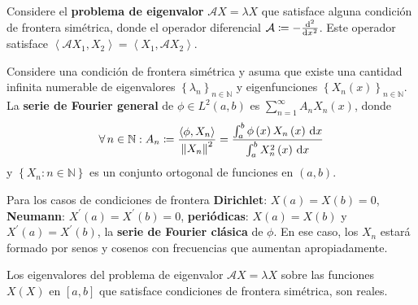 \noindent
Considere el \textbf{problema de eigenvalor}
$\mathcal{A}X=\lambda X$ que satisface alguna condición de frontera
simétrica, donde el operador diferencial
$\mathcal{A}\coloneqq -\diff[2]{}{x}$.
Este operador satisface
\begin{math}
    \left\langle\mathcal{A}X_{1},X_{2}\right\rangle=
    \left\langle X_{1},\mathcal{A}X_{2}\right\rangle
\end{math}.

\begin{definition}
    Considere una condición de frontera simétrica y asuma que existe
    una cantidad infinita numerable de eigenvalores
    ${\left\{\lambda_{n}\right\}}_{n\in\mathbb{N}}$ y eigenfunciones
    ${\left\{X_{n}\left(x\right)\right\}}_{n\in\mathbb{N}}$.
    La \textbf{serie de Fourier general} de
    $\phi\in L^{2}\left(a,b\right)$ es
    \begin{math}
        \sum\limits_{n=1}^{\infty}
        A_{n}X_{n}\left(x\right)
    \end{math},
    donde
    \vspace*{-\baselineskip}\setlength\belowdisplayshortskip{0pt}
    \begin{equation*}
        \forall n\in\mathbb{N}:
        A_{n}\coloneqq
        \frac{
        \left\langle
        \phi,X_{n}
        \right\rangle}{
        \left\|
        X_{n}
        \right\|^{2}}=
        \frac{
            \int_{a}^{b}
            \phi\left(x\right)
            X_{n}\left(x\right)
            \dl x}{
            \int_{a}^{b}
            X^{2}_{n}\left(x\right)
            \dl x}
    \end{equation*}
    y $\left\{X_{n}\colon n\in\mathbb{N}\right\}$ es un conjunto
    ortogonal de funciones en $\left(a,b\right)$.
\end{definition}

Para los casos de condiciones de frontera \textbf{Dirichlet}:
$X\left(a\right)=X\left(b\right)=0$, \textbf{Neumann}:
$X^{\prime}\left(a\right)=X^{\prime}\left(b\right)=0$,
\textbf{periódicas}: $X\left(a\right)=X\left(b\right)$ y
$X^{\prime}\left(a\right)=X^{\prime}\left(b\right)$,
la \textbf{serie de Fourier clásica} de $\phi$.
En ese caso, los $X_{n}$ estará formado por senos y cosenos con
frecuencias que aumentan apropiadamente.

\begin{theorem}
    Los eigenvalores del problema de eigenvalor
    $\mathcal{A}X=\lambda X$ sobre las funciones $X\left(X\right)$ en
    $\left[a,b\right]$ que satisface condiciones de frontera
    simétrica, son reales.
\end{theorem}

